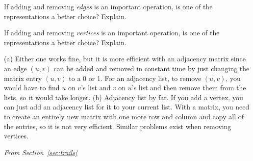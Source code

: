 \begin{requ}
\begin{lenum}
\item If adding and removing {\em edges} is an important operation, is one of the representations a better choice? Explain.
\item If adding and removing {\em vertices} is an important operation, is one of the representations a better choice? Explain.
\end{lenum}
\begin{requanswer}
(a) Either one works fine, but it is more efficient with an adjacency matrix since an edge $(u,v)$ can be added and removed in 
constant time by just changing the matrix entry $(u,v)$ to a 0 or 1. 
For an adjacency list, to remove $(u,v)$, you would have to find $u$ on $v$'s list and $v$ on $u$'s list and then remove them from the lists, so it would take longer.
(b) Adjacency list by far. If you add a vertex, you can just add an adjacency list for it to your current list. With a matrix,
you need to create an entirely new matrix with one more row and column and copy all of the entries, so it is not very efficient.
Similar problems exist when removing vertices.
\end{requanswer}
\end{requ}


\noindent
{\em From Section~\ref{sec:trails}}

